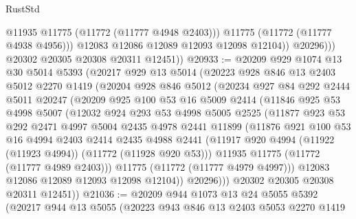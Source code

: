 \begin{lexlean}{RustStd}
\begin{coremodule}
                      @11935
                      @11775
                      (@11772 (@11777 @4948 @2403)))
                    @11775
                    (@11772 (@11777 @4938 @4956)))
                  @12083
                  @12086
                  @12089
                  @12093
                  @12098
                  @12104))
              @20296)))
        @20302
        @20305
        @20308
        @20311
        @12451))
@20933 := @20209
    @929
    @1074
    @13
    @30
    @5014
    @5393
    (@20217
      @929
      @13
      @5014
      (@20223
        @928
        @846
        @13
        @2403
        @5012
        @2270
        @1419
        (@20204
          @928
          @846
          @5012
          (@20234
            @927
            @84
            @292
            @2444
            @5011
            @20247
            (@20209
              @925
              @100
              @53
              @16
              @5009
              @2414
              (@11846
                @925
                @53
                @4998
                @5007
                (@12032
                  @924
                  @293
                  @53
                  @4998
                  @5005
                  @2525
                  (@11877
                    @923
                    @53
                    @292
                    @2471
                    @4997
                    @5004
                    @2435
                    @4978
                    @2441
                    @11899
                    (@11876
                      @921
                      @100
                      @53
                      @16
                      @4994
                      @2403
                      @2414
                      @2435
                      @4988
                      @2441
                      (@11917 @920 @4994 (@11922 (@11923 @4994)) (@11772 (@11928 @920 @53)))
                      @11935
                      @11775
                      (@11772 (@11777 @4989 @2403)))
                    @11775
                    (@11772 (@11777 @4979 @4997)))
                  @12083
                  @12086
                  @12089
                  @12093
                  @12098
                  @12104))
              @20296)))
        @20302
        @20305
        @20308
        @20311
        @12451))
@21036 := @20209
    @944
    @1073
    @13
    @24
    @5055
    @5392
    (@20217
      @944
      @13
      @5055
      (@20223
        @943
        @846
        @13
        @2403
        @5053
        @2270
        @1419

\end{coremodule}
\end{lexlean}

